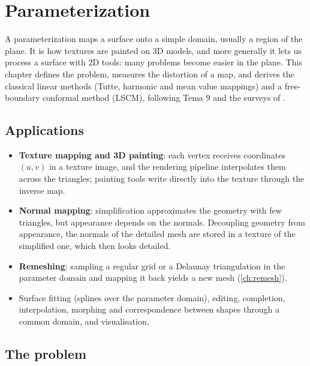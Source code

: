 \chapter{Parameterization}\label{ch:param}

A parameterization maps a surface onto a simple domain, usually a region of the plane. It is how
textures are painted on 3D models, and more generally it lets us process a surface with 2D
tools: many problems become easier in the plane. This chapter defines the problem, measures the
distortion of a map, and derives the classical linear methods (Tutte, harmonic and mean value
mappings) and a free-boundary conformal method (LSCM), following Tema 9 and the surveys of
\citet{Floater2005,Sheffer2006}.

\section{Applications}

\begin{itemize}
  \item \textbf{Texture mapping and 3D painting}: each vertex receives coordinates $(u,v)$ in a
  texture image, and the rendering pipeline interpolates them across the triangles; painting tools
  write directly into the texture through the inverse map.
  \item \textbf{Normal mapping}: simplification approximates the geometry with few triangles,
  but appearance depends on the normals. Decoupling geometry from appearance, the normals of the
  detailed mesh are stored in a texture of the simplified one, which then looks detailed.
  \item \textbf{Remeshing}: sampling a regular grid or a Delaunay triangulation in the parameter
  domain and mapping it back yields a new mesh (\cref{ch:remesh}).
  \item Surface fitting (splines over the parameter domain), editing, completion, interpolation,
  morphing and correspondence between shapes through a common domain, and visualisation.
\end{itemize}

\section{The problem}

